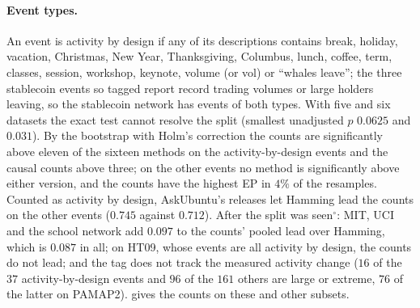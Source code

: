 \documentclass[11pt]{article}
\theoremstyle{dsplain}
\theoremstyle{definition}
\begin{document}
\paragraph{Event types.} An event is activity by design if any of its descriptions contains break, holiday,
vacation, Christmas, New Year, Thanksgiving, Columbus, lunch, coffee, term, classes, session, workshop,
keynote, volume (or vol) or ``whales leave''; the three stablecoin events so tagged report record trading
volumes or large holders leaving, so the stablecoin network has events of both types. With five and six
datasets the exact test cannot resolve the split (smallest unadjusted $p$ $0.0625$ and $0.031$). By the
bootstrap with Holm's correction the counts are significantly above eleven of the sixteen methods on the
activity-by-design events and the causal counts above three; on the other events no method is
significantly above either version, and the counts have the highest EP in $4\%$ of the resamples. Counted
as activity by design, AskUbuntu's releases let Hamming lead the counts on the other events ($0.745$
against $0.712$). After the split was seen$^\circ$: MIT, UCI and the school network add $0.097$ to the
counts' pooled lead over Hamming, which is $0.087$ in all; on HT09, whose events are all activity by design,
the counts do not lead; and the tag does not track the measured activity change ($16$ of the $37$
activity-by-design events and $96$ of the $161$ others are large or extreme, $76$ of the latter on PAMAP2).
 gives the counts on these and other subsets.
\end{document}
